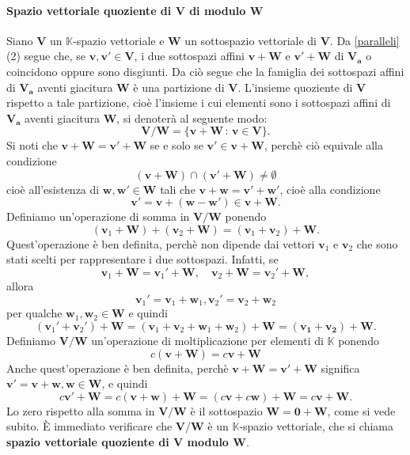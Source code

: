 \documentclass{article}
\theoremstyle{plain}
\theoremstyle{definition}
\theoremstyle{remark}
\begin{document}
\paragraph{Spazio vettoriale quoziente di $\mathbf{V}$ di modulo $\mathbf{W}$}
Siano $\mathbf{V}$ un $\mathbb{K}$-spazio vettoriale e $\mathbf{W}$ un sottospazio vettoriale di $\mathbf{V}$.
Da \ref{paralleli}(2) segue che, se $\mathbf{v},\mathbf{v'}\in\mathbf{V}$, i due sottospazi affini $\mathbf{v}+\mathbf{W}$ e $\mathbf{v'}+\mathbf{W}$ di $\mathbf{V_a}$ o coincidono 
oppure sono disgiunti. Da ciò segue che la famiglia dei sottospazi affini di $\mathbf{V_a}$ aventi giacitura $\mathbf{W}$ è una partizione di $\mathbf{V}$.
L'insieme quoziente di $\mathbf{V}$ rispetto a tale partizione, cioè l'insieme i cui elementi sono i sottospazi affini di $\mathbf{V_a}$ aventi giacitura $\mathbf{W}$, si denoterà al seguente modo:
\[\mathbf{V}/\mathbf{W}=\{\mathbf{v}+\mathbf{W}\,:\,\mathbf{v}\in\mathbf{V}\}.\]
Si noti che $\mathbf{v}+\mathbf{W}=\mathbf{v'}+\mathbf{W}$ se e solo se $\mathbf{v'}\in\mathbf{v}+\mathbf{W}$, perchè ciò equivale alla condizione
\[(\mathbf{v}+\mathbf{W})\cap(\mathbf{v'}+\mathbf{W})\neq\emptyset\]
cioè all'esistenza di $\mathbf{w},\mathbf{w'}\in\mathbf{W}$ tali che $\mathbf{v}+\mathbf{w}=\mathbf{v'}+\mathbf{w'}$, cioè alla condizione 
\[\mathbf{v'}=\mathbf{v}+(\mathbf{w}-\mathbf{w'})\in\mathbf{v}+\mathbf{W}.\]
Definiamo un'operazione di somma in $\mathbf{V}/\mathbf{W}$ ponendo 
\[(\mathbf{v}_1+\mathbf{W})+(\mathbf{v}_2+\mathbf{W})=(\mathbf{v}_1+\mathbf{v}_2)+\mathbf{W}.\]
Quest'operazione è ben definita, perchè non dipende dai vettori $\mathbf{v}_1$ e $\mathbf{v}_2$ che sono stati scelti per rappresentare i due sottospazi. 
Infatti, se 
\[\mathbf{v}_1+\mathbf{W}=\mathbf{v}_1'+\mathbf{W},\quad \mathbf{v}_2+\mathbf{W}=\mathbf{v}_2'+\mathbf{W},\]
allora
\[\mathbf{v}_1'=\mathbf{v}_1+\mathbf{w}_1, \mathbf{v}_2'=\mathbf{v}_2+\mathbf{w}_2\] 
per qualche $\mathbf{w}_1,\mathbf{w}_2\in\mathbf{W}$ e quindi
\[(\mathbf{v}_1'+\mathbf{v}_2')+\mathbf{W}=(\mathbf{v}_1+\mathbf{v}_2+\mathbf{w}_1+\mathbf{w}_2)+\mathbf{W}=(\mathbf{v_1}+\mathbf{v_2})+\mathbf{W}.\]
Definiamo $\mathbf{V}/\mathbf{W}$ un'operazione di moltiplicazione per elementi di $\mathbb{K}$ ponendo 
\[c(\mathbf{v}+\mathbf{W})=c\mathbf{v}+\mathbf{W}\]
Anche quest'operazione è ben definita, perchè $\mathbf{v}+\mathbf{W}=\mathbf{v'}+\mathbf{W}$ significa $\mathbf{v'}=\mathbf{v}+\mathbf{w},\mathbf{w}\in\mathbf{W}$, e quindi 
\[c\mathbf{v'}+\mathbf{W}=c(\mathbf{v}+\mathbf{w})+\mathbf{W}=(c\mathbf{v}+c\mathbf{w})+\mathbf{W}=c\mathbf{v}+\mathbf{W}.\]
Lo zero rispetto alla somma in $\mathbf{V}/\mathbf{W}$ è il sottospazio $\mathbf{W}=\mathbf{0}+\mathbf{W}$, come si vede subito. È immediato verificare che $\mathbf{V}/\mathbf{W}$ è un $\mathbb{K}$-spazio vettoriale, 
che si chiama \textbf{spazio vettoriale quoziente di $\mathbf{V}$ modulo $\mathbf{W}$}.
\end{document}
